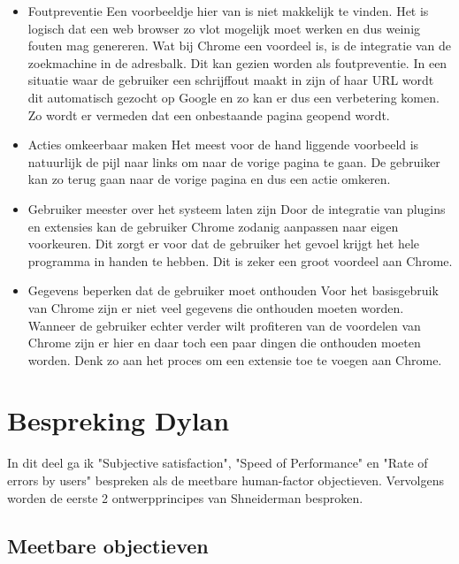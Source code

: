 \documentclass[12pt]{article}
\begin{document}
\begin{itemize}
\begin{figure}
  \label{fig:loading}
\end{figure}
\item Foutpreventie 
\newline
Een voorbeeldje hier van is niet makkelijk te vinden. Het is logisch dat een web browser zo vlot mogelijk moet werken en dus weinig fouten mag genereren. Wat bij Chrome een voordeel is, is de integratie van de zoekmachine in de adresbalk. Dit kan gezien worden als foutpreventie. In een situatie waar de gebruiker een schrijffout maakt in zijn of haar URL wordt dit automatisch gezocht op Google en zo kan er dus een verbetering komen. Zo wordt er vermeden dat een onbestaande pagina geopend wordt.
\item Acties omkeerbaar maken
\newline
Het meest voor de hand liggende voorbeeld is natuurlijk de pijl naar links om naar de vorige pagina te gaan. De gebruiker kan zo terug gaan naar de vorige pagina en dus een actie omkeren.
\item Gebruiker meester over het systeem laten zijn
\newline
Door de integratie van plugins en extensies kan de gebruiker Chrome zodanig aanpassen naar eigen voorkeuren. Dit zorgt er voor dat de gebruiker het gevoel krijgt het hele programma in handen te hebben. Dit is zeker een groot voordeel aan Chrome.
\item Gegevens beperken dat de gebruiker moet onthouden
\newline
Voor het basisgebruik van Chrome zijn er niet veel gegevens die onthouden moeten worden. Wanneer de gebruiker echter verder wilt profiteren van de voordelen van Chrome zijn er hier en daar toch een paar dingen die onthouden moeten worden. Denk zo aan het proces om een extensie toe te voegen aan Chrome.
\end{itemize}
\newpage

\section{Bespreking Dylan}
In dit deel ga ik "Subjective satisfaction", "Speed of Performance" en "Rate of errors by users" bespreken als de meetbare human-factor objectieven. Vervolgens worden de eerste 2 ontwerpprincipes van Shneiderman besproken.
\subsection{Meetbare objectieven}
\end{document}
